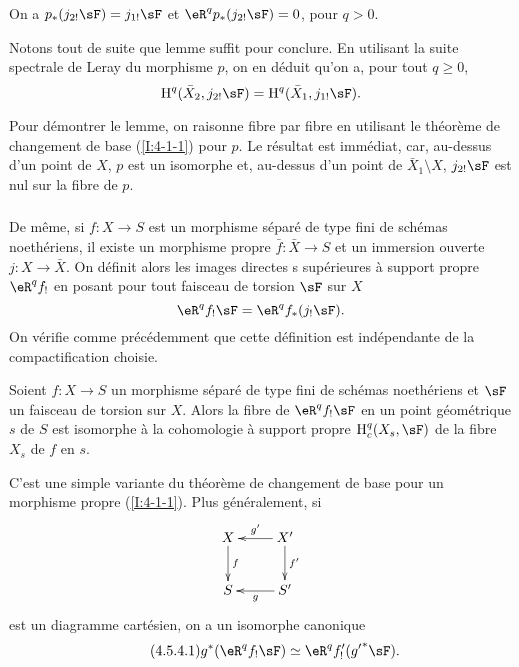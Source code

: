 \begin{lemma}\label{I:4-5-2}
On a $p_*(j_{2!} \sF) = j_{1!} \sF$ et $\eR^q p_*(j_{2!} \sF) = 0$, pour $q>0$. 
\end{lemma}

Notons tout de suite que lemme suffit pour conclure. En utilisant la suite 
spectrale de Leray du morphisme $p$, on en déduit qu'on a, pour tout 
$q\geqslant 0$, 
\[
  \h^q(\bar X_2, j_{2!} \sF) = \h^q(\bar X_1, j_{1!} \sF) \text{.}
\]

Pour démontrer le lemme, on raisonne fibre par fibre en utilisant le théorème 
de changement de base (\ref{I:4-1-1}) pour $p$. Le résultat est immédiat, car, 
au-dessus d'un point de $X$, $p$ est un isomorphe et, au-dessus d'un point de 
$\bar X_1\setminus X$, $j_{2!} \sF$ est nul sur la fibre de $p$. 





\subsubsection{}\label{I:4-5-3}

De même, si $f:X\to S$ est un morphisme séparé de type fini de schémas 
noethériens, il existe un morphisme propre $\bar f:\bar X\to S$ et un 
immersion ouverte $j:X\to \bar X$. On définit alors les images directes s
supérieures à support propre $\eR^q f_!$ en posant pour tout faisceau de 
torsion $\sF$ sur $X$
\[
  \eR^q f_! \sF = \eR^q f_*(j_! \sF) \text{.}
\]
On vérifie comme précédemment que cette définition est indépendante de 
la compactification choisie. 





\begin{theorem}\label{I:4-5-4}
Soient $f:X\to S$ un morphisme séparé de type fini de schémas noethériens 
et $\sF$ un faisceau de torsion sur $X$. Alors la fibre de $\eR^q f_! \sF$ en un 
point géométrique $s$ de $S$ est isomorphe à la cohomologie à support 
propre $\h_c^q(X_s,\sF)$ de la fibre $X_s$ de $f$ en $s$. 
\end{theorem}

C'est une simple variante du théorème de changement de base pour un morphisme 
propre (\ref{I:4-1-1}). Plus généralement, si 
\[\xymatrix{
  X \ar[d]^-f
    & X' \ar[l]_-{g'} \ar[d]^-{f'} \\
  S 
    & S' \ar[l]^-g
}\]
est un diagramme cartésien, on a un isomorphe canonique 
\begin{equation*}\tag{4.5.4.1}\label{I:eq:4-5-4-1}
  g^* (\eR^q f_! \sF) \simeq \eR^q f_!'({g'}^* \sF) \text{.}
\end{equation*}










